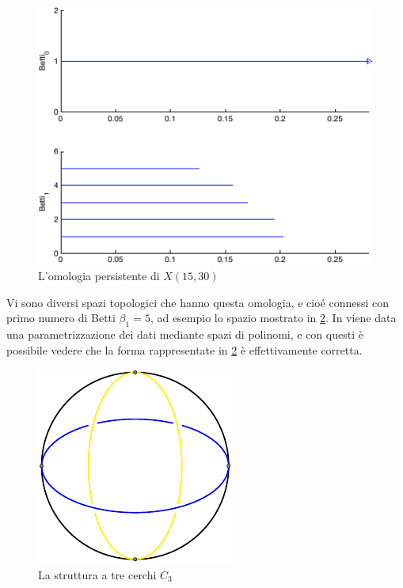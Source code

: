 \begin{figure}[ht]
  \begin{center}
    \includegraphics[width=.8\linewidth]{gfx/image_patches_k15.pdf}
    \caption{L'omologia persistente di $X(15,30)$}
    \label{fig:k15persistence}
  \end{center}
\end{figure}

Vi sono diversi spazi topologici che hanno questa omologia, e cioé connessi con primo numero di Betti $\beta_1=5$, ad esempio lo spazio mostrato in \cref{fig:patchshape}. In \cite{Carlsson2008} viene data una parametrizzazione dei dati mediante spazi di polinomi, e con questi è possibile vedere che la forma rappresentate in \cref{fig:patchshape} è effettivamente corretta.

\begin{figure}[ht]
  \begin{center}
    \includegraphics[width=.8\linewidth]{gfx/patches_shape.pdf}
    \caption{La struttura a tre cerchi $C_3$}
    \label{fig:patchshape}
  \end{center}
\end{figure}

